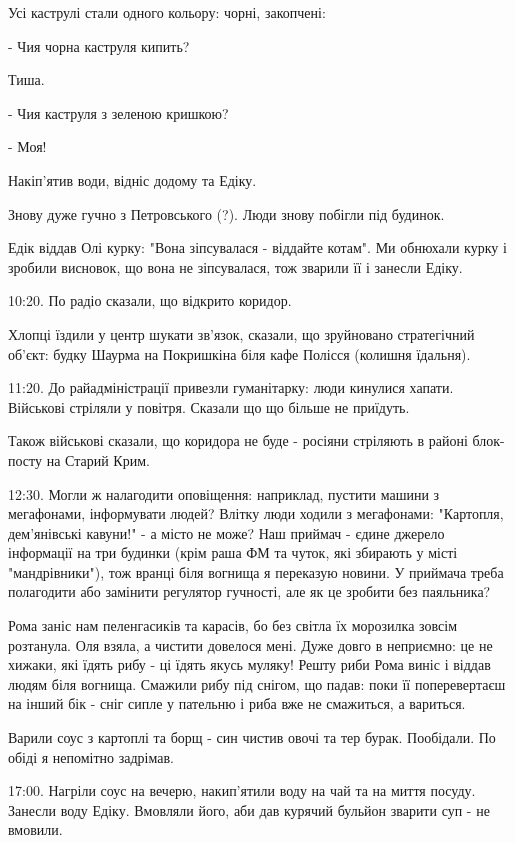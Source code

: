 Усі каструлі стали одного кольору: чорні, закопчені:

- Чия чорна каструля кипить?

Тиша.

- Чия каструля з зеленою кришкою?

- Моя!

Накіп'ятив води, відніс додому та Едіку.

Знову дуже гучно з Петровського (?). Люди знову побігли під будинок.

Едік віддав Олі курку: "Вона зіпсувалася - віддайте котам". Ми обнюхали курку і
зробили висновок, що вона не зіпсувалася, тож зварили її і занесли Едіку. 


10:20. По радіо сказали, що відкрито коридор.

Хлопці їздили у центр шукати зв'язок, сказали, що зруйновано стратегічний
об'єкт: будку Шаурма на Покришкіна біля кафе Полісся (колишня їдальня).

11:20. До райадміністрації привезли гуманітарку: люди кинулися хапати.
Військові стріляли у повітря. Сказали що що більше не приїдуть.

Також військові сказали, що коридора не буде - росіяни стріляють в районі
блок-посту на Старий Крим. 


12:30. Могли ж налагодити оповіщення: наприклад,  пустити машини з мегафонами,
інформувати людей? Влітку люди ходили з мегафонами: "Картопля, дем'янівські
кавуни!" - а місто не може? Наш приймач - єдине джерело інформації на три
будинки (крім раша ФМ та чуток, які збирають у місті "мандрівники"), тож вранці
біля вогнища я переказую новини. У приймача треба полагодити або замінити
регулятор гучності, але як це зробити без паяльника?

Рома заніс нам пеленгасиків та карасів, бо без світла їх морозилка зовсім
розтанула. Оля взяла, а чистити довелося мені. Дуже довго в неприємно: це не
хижаки, які їдять рибу - ці їдять якусь муляку! Решту риби Рома виніс і віддав
людям біля вогнища. Смажили рибу під снігом, що падав: поки її поперевертаєш на
інший бік - сніг сипле у пательню і риба вже не смажиться, а вариться.

Варили соус з картоплі та борщ - син чистив овочі та тер бурак. Пообідали. По
обіді я непомітно задрімав.

17:00. Нагріли соус на вечерю, накип'ятили воду на чай та на миття посуду.
Занесли воду Едіку. Вмовляли його, аби дав курячий бульйон зварити суп - не
вмовили.

